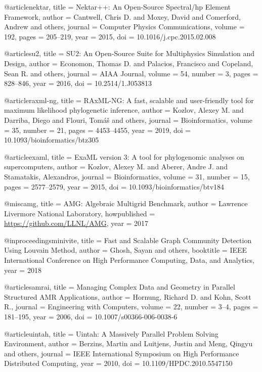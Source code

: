 @article{nektar,
  title = {Nektar++: An Open-Source Spectral/hp Element Framework},
  author = {Cantwell, Chris D. and Moxey, David and Comerford, Andrew and others},
  journal = {Computer Physics Communications},
  volume = {192},
  pages = {205--219},
  year = {2015},
  doi = {10.1016/j.cpc.2015.02.008}
}

@article{su2,
  title = {{SU2}: An Open-Source Suite for Multiphysics Simulation and Design},
  author = {Economon, Thomas D. and Palacios, Francisco and Copeland, Sean R. and others},
  journal = {AIAA Journal},
  volume = {54},
  number = {3},
  pages = {828--846},
  year = {2016},
  doi = {10.2514/1.J053813}
}

@article{raxml-ng,
  title = {{RAxML-NG}: A fast, scalable and user-friendly tool for maximum likelihood phylogenetic inference},
  author = {Kozlov, Alexey M. and Darriba, Diego and Flouri, Tom{\'a}{\v{s}} and others},
  journal = {Bioinformatics},
  volume = {35},
  number = {21},
  pages = {4453--4455},
  year = {2019},
  doi = {10.1093/bioinformatics/btz305}
}

@article{examl,
  title = {{ExaML} version 3: A tool for phylogenomic analyses on supercomputers},
  author = {Kozlov, Alexey M. and Aberer, Andre J. and Stamatakis, Alexandros},
  journal = {Bioinformatics},
  volume = {31},
  number = {15},
  pages = {2577--2579},
  year = {2015},
  doi = {10.1093/bioinformatics/btv184}
}

@misc{amg,
  title = {{AMG}: Algebraic Multigrid Benchmark},
  author = {{Lawrence Livermore National Laboratory}},
  howpublished = {\url{https://github.com/LLNL/AMG}},
  year = {2017}
}

@inproceedings{minivite,
  title = {Fast and Scalable Graph Community Detection Using {Louvain} Method},
  author = {Ghosh, Sayan and others},
  booktitle = {IEEE International Conference on High Performance Computing, Data, and Analytics},
  year = {2018}
}

@article{samrai,
  title = {Managing Complex Data and Geometry in Parallel Structured {AMR} Applications},
  author = {Hornung, Richard D. and Kohn, Scott R.},
  journal = {Engineering with Computers},
  volume = {22},
  number = {3--4},
  pages = {181--195},
  year = {2006},
  doi = {10.1007/s00366-006-0038-6}
}

@article{uintah,
  title = {Uintah: A Massively Parallel Problem Solving Environment},
  author = {Berzins, Martin and Luitjens, Justin and Meng, Qingyu and others},
  journal = {IEEE International Symposium on High Performance Distributed Computing},
  year = {2010},
  doi = {10.1109/HPDC.2010.5547150}
}

